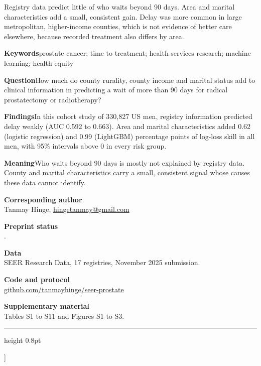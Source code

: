 \documentclass[10pt,a4paper,twocolumn]{article}
\begin{document}
{\begin{minipage}[t]{0.645\textwidth}
 Registry data predict little of who waits beyond 90 days. Area and marital characteristics add a small, consistent gain. Delay was more common in large metropolitan, higher-income counties, which is not evidence of better care elsewhere, because recorded treatment also differs by area.

{\sffamily\footnotesize\textbf{Keywords}\enspace prostate cancer; time to treatment; health services research; machine learning; health equity\par}
\end{minipage}\hfill
\begin{minipage}[t]{0.325\textwidth}
\vspace{0pt}
\colorbox{accentlight}{\parbox{\dimexpr\linewidth-2\fboxsep}{\sffamily\footnotesize\setlength{\parskip}{4pt}\raggedright
{}\par
\textbf{Question}\enspace How much do county rurality, county income and marital status add to clinical information in predicting a wait of more than 90 days for radical prostatectomy or radiotherapy?\par
\textbf{Findings}\enspace In this cohort study of 330,827 US men, registry information predicted delay weakly (AUC 0.592 to 0.663). Area and marital characteristics added 0.62 (logistic regression) and 0.99 (LightGBM) percentage points of log-loss skill in all men, with 95\% intervals above 0 in every risk group.\par
\textbf{Meaning}\enspace Who waits beyond 90 days is mostly not explained by registry data. County and marital characteristics carry a small, consistent signal whose causes these data cannot identify.\par\vspace{2pt}}}

\vspace{6pt}
{\sffamily\scriptsize\raggedright\setlength{\parskip}{4pt}\color{black!80}
\textbf{Corresponding author}\\Tanmay Hinge, \href{mailto:hingetanmay@gmail.com}{hingetanmay@gmail.com}\par
\textbf{Preprint status}\\\docversion.\par
\textbf{Data}\\SEER Research Data, 17 registries, November 2025 submission.\par
\textbf{Code and protocol}\\\href{https://github.com/tanmayhinge/seer-prostate}{github.com/tanmayhinge/seer-prostate}\par
\textbf{Supplementary material}\\Tables S1 to S11 and Figures S1 to S3.\par}
\end{minipage}

\vspace{9pt}
{\color{accent}\hrule height 0.8pt}
\vspace{14pt}
}]
\end{document}
